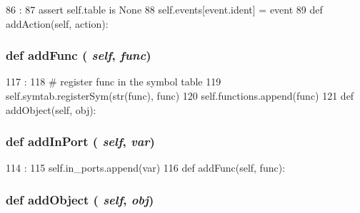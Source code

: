 \begin{DoxyCode}
86                              :
87         assert self.table is None
88         self.events[event.ident] = event
89 
    def addAction(self, action):
\end{DoxyCode}
\hypertarget{classslicc_1_1symbols_1_1StateMachine_1_1StateMachine_a8d499326f557cbeadeab18a84e8e0dc6}{
\subsubsection[{addFunc}]{\setlength{\rightskip}{0pt plus 5cm}def addFunc ( {\em self}, \/   {\em func})}}
\label{classslicc_1_1symbols_1_1StateMachine_1_1StateMachine_a8d499326f557cbeadeab18a84e8e0dc6}



\begin{DoxyCode}
117                            :
118         # register func in the symbol table
119         self.symtab.registerSym(str(func), func)
120         self.functions.append(func)
121 
    def addObject(self, obj):
\end{DoxyCode}
\hypertarget{classslicc_1_1symbols_1_1StateMachine_1_1StateMachine_a0ab73bf36b127f7138fd40fd95e22db4}{
\subsubsection[{addInPort}]{\setlength{\rightskip}{0pt plus 5cm}def addInPort ( {\em self}, \/   {\em var})}}
\label{classslicc_1_1symbols_1_1StateMachine_1_1StateMachine_a0ab73bf36b127f7138fd40fd95e22db4}



\begin{DoxyCode}
114                             :
115         self.in_ports.append(var)
116 
    def addFunc(self, func):
\end{DoxyCode}
\hypertarget{classslicc_1_1symbols_1_1StateMachine_1_1StateMachine_a87866fd7076ee9f239bc4f4b73689dfb}{
\subsubsection[{addObject}]{\setlength{\rightskip}{0pt plus 5cm}def addObject ( {\em self}, \/   {\em obj})}}
\label{classslicc_1_1symbols_1_1StateMachine_1_1StateMachine_a87866fd7076ee9f239bc4f4b73689dfb}




